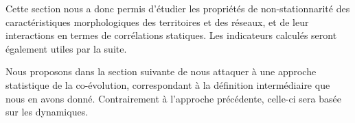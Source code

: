 






\stars




Cette section nous a donc permis d'étudier les propriétés de non-stationnarité des caractéristiques morphologiques des territoires et des réseaux, et de leur interactions en termes de corrélations statiques. Les indicateurs calculés seront également utiles par la suite.


Nous proposons dans la section suivante de nous attaquer à une approche statistique de la co-évolution, correspondant à la définition intermédiaire que nous en avons donné. Contrairement à l'approche précédente, celle-ci sera basée sur les dynamiques.


\stars



